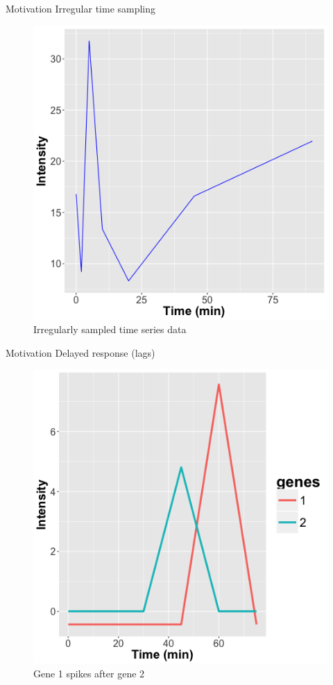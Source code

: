 \documentclass[10pt]{beamer}
\begin{document}
\begin{frame}{Motivation}
Irregular time sampling

\begin{figure}
     \includegraphics[width=0.6\linewidth]{sample.png}
      \caption{Irregularly sampled time series data}
       \label{fig:irregular}
    \end{figure}

\end{frame}


\begin{frame}{Motivation}
Delayed response (lags)

\begin{figure}
     \includegraphics[width=0.5\linewidth]{delay.png}
      \caption{Gene 1 spikes after gene 2}
       \label{fig:irregular}
    \end{figure}

\end{frame}
\end{document}
